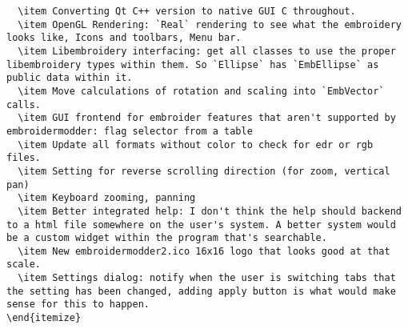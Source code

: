\begin{verbatim}
  \item Converting Qt C++ version to native GUI C throughout.
  \item OpenGL Rendering: `Real` rendering to see what the embroidery looks like, Icons and toolbars, Menu bar.
  \item Libembroidery interfacing: get all classes to use the proper libembroidery types within them. So `Ellipse` has `EmbEllipse` as public data within it.
  \item Move calculations of rotation and scaling into `EmbVector` calls.
  \item GUI frontend for embroider features that aren't supported by embroidermodder: flag selector from a table
  \item Update all formats without color to check for edr or rgb files.
  \item Setting for reverse scrolling direction (for zoom, vertical pan)
  \item Keyboard zooming, panning
  \item Better integrated help: I don't think the help should backend to a html file somewhere on the user's system. A better system would be a custom widget within the program that's searchable.
  \item New embroidermodder2.ico 16x16 logo that looks good at that scale.
  \item Settings dialog: notify when the user is switching tabs that the setting has been changed, adding apply button is what would make sense for this to happen.
\end{itemize}
\end{verbatim}


